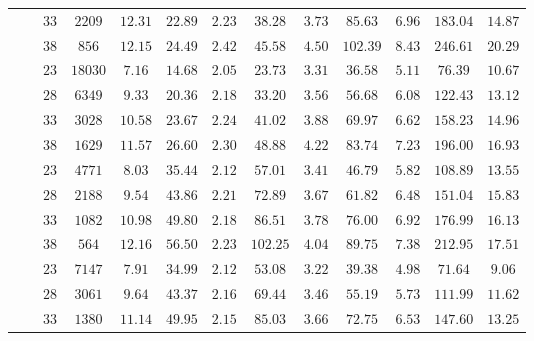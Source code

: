 \begin{table}
\begin{center}
\begin{tabular}{c|c|c|c|c|c|c|c|c|c|c|c|c}
			& & $33$ & $2209$ & $12.31$ & $22.89$ & $2.23$ & $38.28$ & $3.73$ & $85.63$ & $6.96$ & $183.04$ & $14.87$ \\
			& & $38$ & $856$ & $12.15$ & $24.49$ & $2.42$ & $45.58$ & $4.50$ & $102.39$ & $8.43$ & $246.61$ & $20.29$ \\
			&  &
			$23$ & $18030$ & $7.16$ & $14.68$ & $2.05$ & $23.73$ & $3.31$ & $36.58$ & $5.11$ & $76.39$ & $10.67$ \\
			& & $28$ & $6349$ & $9.33$ & $20.36$ & $2.18$ & $33.20$ & $3.56$ & $56.68$ & $6.08$ & $122.43$ & $13.12$ \\
			& & $33$ & $3028$ & $10.58$ & $23.67$ & $2.24$ & $41.02$ & $3.88$ & $69.97$ & $6.62$ & $158.23$ & $14.96$ \\
			& & $38$ & $1629$ & $11.57$ & $26.60$ & $2.30$ & $48.88$ & $4.22$ & $83.74$ & $7.23$ & $196.00$ & $16.93$ \\
			&  &
			$23$ & $4771$ & $8.03$ & $35.44$ & $2.12$ & $57.01$ & $3.41$ & $46.79$ & $5.82$ & $108.89$ & $13.55$ \\
			& & $28$ & $2188$ & $9.54$ & $43.86$ & $2.21$ & $72.89$ & $3.67$ & $61.82$ & $6.48$ & $151.04$ & $15.83$ \\
			& & $33$ & $1082$ & $10.98$ & $49.80$ & $2.18$ & $86.51$ & $3.78$ & $76.00$ & $6.92$ & $176.99$ & $16.13$ \\
			& & $38$ & $564$ & $12.16$ & $56.50$ & $2.23$ & $102.25$ & $4.04$ & $89.75$ & $7.38$ & $212.95$ & $17.51$ \\
			&  &
			$23$ & $7147$ & $7.91$ & $34.99$ & $2.12$ & $53.08$ & $3.22$ & $39.38$ & $4.98$ & $71.64$ & $9.06$ \\
			& & $28$ & $3061$ & $9.64$ & $43.37$ & $2.16$ & $69.44$ & $3.46$ & $55.19$ & $5.73$ & $111.99$ & $11.62$ \\
			& & $33$ & $1380$ & $11.14$ & $49.95$ & $2.15$ & $85.03$ & $3.66$ & $72.75$ & $6.53$ & $147.60$ & $13.25$ \\

\end{tabular}
\end{center}
\end{table}
